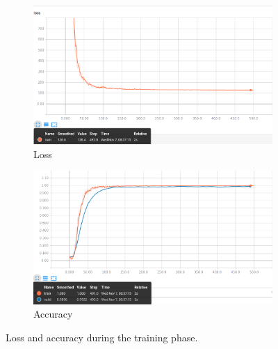 \documentclass[journal, twocolumn]{IEEEtran}
\begin{document}
\begin{figure}
  
  \begin{subfigure}[b]{\linewidth}
  	\centering
    \includegraphics[width=1\linewidth]{img/loss.png}
	\caption{Loss}
	\label{fig:loss}
  \end{subfigure}
  
  \hspace{3mm}
  
  \begin{subfigure}[b]{\linewidth}
  	\centering
    \includegraphics[width=1\linewidth]{img/acc.png}
	\caption{Accuracy}
	\label{fig:acc}
  \end{subfigure}
  
  \caption{Loss and accuracy during the training phase.} 
  \label{fig:training-phase}
\end{figure}


%
%
\end{document}
